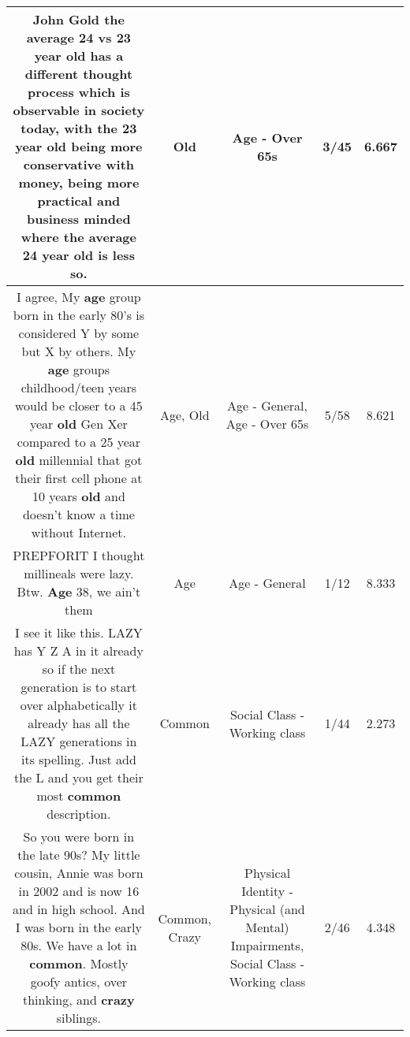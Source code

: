 \documentclass[11pt]{article}
\newlength\mylength
\begin{document}
\begin{center}
\begin{longtable}{|C{.65\mylength}|C{.30\mylength}|C{.12\mylength}|C{.12\mylength}|C{.12\mylength}|}
  \small John Gold the average 24 vs 23 year \textbf{old} has a different thought process which is observable in society today, with the 23 year \textbf{old} being more conservative with money, being more practical and business minded where the average 24 year \textbf{old} is less so.\normalsize   & Old & Age - Over 65s & 3/45 & 6.667 \\  \hline
  \small I agree, My \textbf{age} group born in the early 80's is considered Y by some but X by others. My \textbf{age} groups childhood/teen years would be closer to a 45 year \textbf{old} Gen Xer compared to a 25 year \textbf{old} millennial that got their  first cell phone at 10 years \textbf{old} and doesn't know a time without Internet.\normalsize   & Age, Old & Age - General, Age - Over 65s & 5/58 & 8.621 \\  \hline
  \small PREPFORIT I thought millineals were lazy. Btw. \textbf{Age} 38, we ain't them\normalsize   & Age & Age - General & 1/12 & 8.333 \\  \hline
  \small I see it like this. LAZY has Y Z A in it already so if the next generation is to start over alphabetically it already has all the LAZY generations in its spelling. Just add the L and you get their most \textbf{common}  description.\normalsize   & Common & Social Class - Working class & 1/44 & 2.273 \\  \hline
  \small So you were born in the late 90s? My little cousin, Annie was born in 2002 and is now 16 and in high school. And I was born in the early 80s. We have a lot in \textbf{common}. Mostly goofy antics, over thinking, and \textbf{crazy} siblings.\normalsize   & Common, Crazy & Physical Identity - Physical (and Mental) Impairments, Social Class - Working class & 2/46 & 4.348 \\  \hline

\end{longtable}
\end{center}
\end{document}
